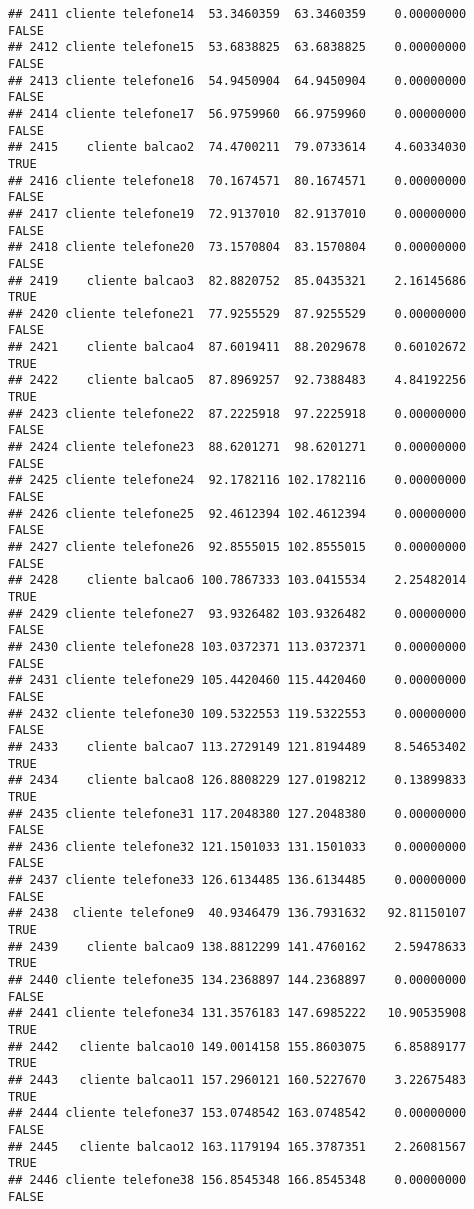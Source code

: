 \documentclass[
]{article}
\begin{document}
\begin{verbatim}
## 2411 cliente telefone14  53.3460359  63.3460359    0.00000000    FALSE
## 2412 cliente telefone15  53.6838825  63.6838825    0.00000000    FALSE
## 2413 cliente telefone16  54.9450904  64.9450904    0.00000000    FALSE
## 2414 cliente telefone17  56.9759960  66.9759960    0.00000000    FALSE
## 2415    cliente balcao2  74.4700211  79.0733614    4.60334030     TRUE
## 2416 cliente telefone18  70.1674571  80.1674571    0.00000000    FALSE
## 2417 cliente telefone19  72.9137010  82.9137010    0.00000000    FALSE
## 2418 cliente telefone20  73.1570804  83.1570804    0.00000000    FALSE
## 2419    cliente balcao3  82.8820752  85.0435321    2.16145686     TRUE
## 2420 cliente telefone21  77.9255529  87.9255529    0.00000000    FALSE
## 2421    cliente balcao4  87.6019411  88.2029678    0.60102672     TRUE
## 2422    cliente balcao5  87.8969257  92.7388483    4.84192256     TRUE
## 2423 cliente telefone22  87.2225918  97.2225918    0.00000000    FALSE
## 2424 cliente telefone23  88.6201271  98.6201271    0.00000000    FALSE
## 2425 cliente telefone24  92.1782116 102.1782116    0.00000000    FALSE
## 2426 cliente telefone25  92.4612394 102.4612394    0.00000000    FALSE
## 2427 cliente telefone26  92.8555015 102.8555015    0.00000000    FALSE
## 2428    cliente balcao6 100.7867333 103.0415534    2.25482014     TRUE
## 2429 cliente telefone27  93.9326482 103.9326482    0.00000000    FALSE
## 2430 cliente telefone28 103.0372371 113.0372371    0.00000000    FALSE
## 2431 cliente telefone29 105.4420460 115.4420460    0.00000000    FALSE
## 2432 cliente telefone30 109.5322553 119.5322553    0.00000000    FALSE
## 2433    cliente balcao7 113.2729149 121.8194489    8.54653402     TRUE
## 2434    cliente balcao8 126.8808229 127.0198212    0.13899833     TRUE
## 2435 cliente telefone31 117.2048380 127.2048380    0.00000000    FALSE
## 2436 cliente telefone32 121.1501033 131.1501033    0.00000000    FALSE
## 2437 cliente telefone33 126.6134485 136.6134485    0.00000000    FALSE
## 2438  cliente telefone9  40.9346479 136.7931632   92.81150107     TRUE
## 2439    cliente balcao9 138.8812299 141.4760162    2.59478633     TRUE
## 2440 cliente telefone35 134.2368897 144.2368897    0.00000000    FALSE
## 2441 cliente telefone34 131.3576183 147.6985222   10.90535908     TRUE
## 2442   cliente balcao10 149.0014158 155.8603075    6.85889177     TRUE
## 2443   cliente balcao11 157.2960121 160.5227670    3.22675483     TRUE
## 2444 cliente telefone37 153.0748542 163.0748542    0.00000000    FALSE
## 2445   cliente balcao12 163.1179194 165.3787351    2.26081567     TRUE
## 2446 cliente telefone38 156.8545348 166.8545348    0.00000000    FALSE

\end{verbatim}
\end{document}
